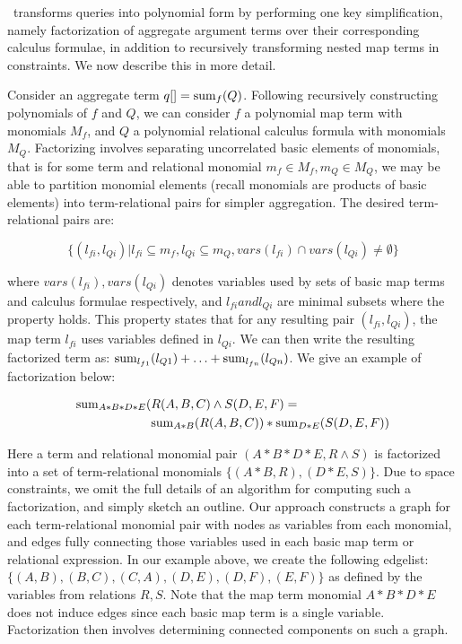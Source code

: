 \compiler\ transforms queries into polynomial form by performing one key
simplification, namely factorization of aggregate argument terms over their
corresponding calculus formulae, in addition to recursively transforming
nested map terms in constraints. We now describe this in more detail.

Consider an aggregate term $q[] = \mathrm{sum}_{f}(Q)$. Following recursively
constructing polynomials of $f$ and $Q$, we can consider $f$ a polynomial map
term with monomials $M_f$, and $Q$ a polynomial relational calculus formula
with monomials $M_Q$. Factorizing involves separating uncorrelated basic
elements of monomials, that is for some term and relational monomial $m_f
\in M_f, m_Q \in M_Q$, we may be able to partition monomial elements (recall
monomials are products of basic elements) into term-relational pairs for simpler
aggregation. The desired term-relational pairs are:

\vspace{-3mm}
\[\{(l_{fi},l_{Qi}) | l_{fi} \subseteq m_f, l_{Qi} \subseteq m_Q,
vars(l_{fi}) \cap vars(l_{Qi}) \neq \emptyset\}\]

\noindent where $vars(l_{fi}), vars(l_{Qi})$ denotes variables used by sets of basic
map terms and calculus formulae respectively, and $l_{fi} and l_{Qi}$ are minimal
subsets where the property holds. This property states that for any resulting
pair $(l_{fi}, l_{Qi})$, the map term $l_{fi}$ uses variables defined in $l_{Qi}$. We can
then write the resulting factorized term as:
$\mathrm{sum}_{l_{f1}}(l_{Q1}) + \ldots + \mathrm{sum}_{l_{fn}}(l_{Qn})$.
We give an example of factorization below:

\vspace{-3mm}
\begin{align*}
\mathrm{sum}_{A*B*D*E}( & R(A,B,C) \wedge S(D,E,F) =\\
& \mathrm{sum}_{A*B}(R(A,B,C)) * \mathrm{sum}_{D*E}(S(D,E,F))
\end{align*}

Here a term and relational monomial pair $(A*B*D*E, R \wedge S)$ is factorized
into a set of term-relational monomials $\{(A*B,R), (D*E,S)\}$. Due to space
constraints, we omit the full details of an algorithm for computing such a
factorization, and simply sketch an outline. Our approach constructs a graph for
each term-relational monomial pair with nodes as variables from each monomial,
and edges fully connecting those variables used in each basic map term or
relational expression. In our example above, we create the following edgelist:
$\{(A,B), (B,C), (C,A), (D,E), (D,F), (E,F)\}$ as defined by the variables from
relations $R,S$. Note that the map term monomial $A*B*D*E$ does not induce edges
since each basic map term is a single variable. Factorization then involves
determining connected components on such a graph.


